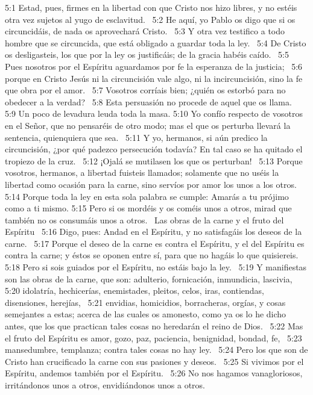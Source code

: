 5:1 Estad, pues, firmes en la libertad con que Cristo nos hizo libres, y no estéis otra vez sujetos al yugo de esclavitud.  
5:2 He aquí, yo Pablo os digo que si os circuncidáis, de nada os aprovechará Cristo.  
5:3 Y otra vez testifico a todo hombre que se circuncida, que está obligado a guardar toda la ley.  
5:4 De Cristo os desligasteis, los que por la ley os justificáis; de la gracia habéis caído.  
5:5 Pues nosotros por el Espíritu aguardamos por fe la esperanza de la justicia;  
5:6 porque en Cristo Jesús ni la circuncisión vale algo, ni la incircuncisión, sino la fe que obra por el amor.  
5:7 Vosotros corríais bien; ¿quién os estorbó para no obedecer a la verdad?  
5:8 Esta persuasión no procede de aquel que os llama.  
5:9 Un poco de levadura leuda toda la masa. 
5:10 Yo confío respecto de vosotros en el Señor, que no pensaréis de otro modo; mas el que os perturba llevará la sentencia, quienquiera que sea.  
5:11 Y yo, hermanos, si aún predico la circuncisión, ¿por qué padezco persecución todavía? En tal caso se ha quitado el tropiezo de la cruz.  
5:12 ¡Ojalá se mutilasen los que os perturban!  
5:13 Porque vosotros, hermanos, a libertad fuisteis llamados; solamente que no uséis la libertad como ocasión para la carne, sino servíos por amor los unos a los otros.  
5:14 Porque toda la ley en esta sola palabra se cumple: Amarás a tu prójimo como a ti mismo. 
5:15 Pero si os mordéis y os coméis unos a otros, mirad que también no os consumáis unos a otros.  
Las obras de la carne y el fruto del Espíritu  
5:16 Digo, pues: Andad en el Espíritu, y no satisfagáis los deseos de la carne.  
5:17 Porque el deseo de la carne es contra el Espíritu, y el del Espíritu es contra la carne; y éstos se oponen entre sí, para que no hagáis lo que quisiereis. 
5:18 Pero si sois guiados por el Espíritu, no estáis bajo la ley.  
5:19 Y manifiestas son las obras de la carne, que son: adulterio, fornicación, inmundicia, lascivia, 
5:20 idolatría, hechicerías, enemistades, pleitos, celos, iras, contiendas, disensiones, herejías,  
5:21 envidias, homicidios, borracheras, orgías, y cosas semejantes a estas; acerca de las cuales os amonesto, como ya os lo he dicho antes, que los que practican tales cosas no heredarán el reino de Dios.  
5:22 Mas el fruto del Espíritu es amor, gozo, paz, paciencia, benignidad, bondad, fe,  
5:23 mansedumbre, templanza; contra tales cosas no hay ley.  
5:24 Pero los que son de Cristo han crucificado la carne con sus pasiones y deseos.  
5:25 Si vivimos por el Espíritu, andemos también por el Espíritu.  
5:26 No nos hagamos vanagloriosos, irritándonos unos a otros, envidiándonos unos a otros.  
